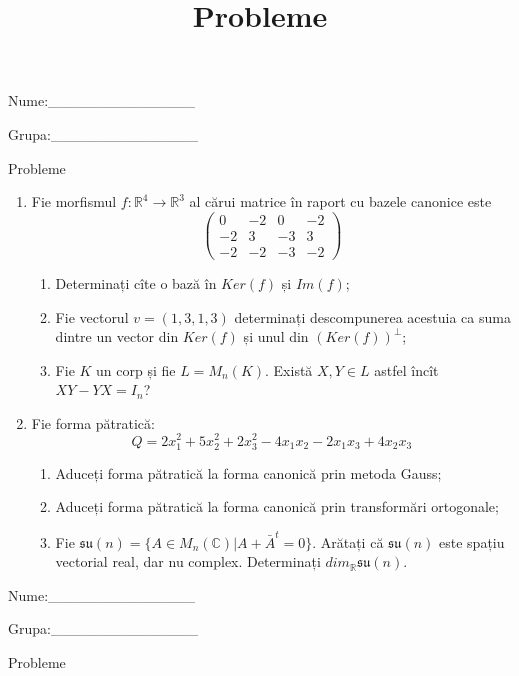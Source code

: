 \documentclass{article}
\title{Probleme}
\author{ }
\date{ }
\begin{document}
\begin{flushright}
Nume:\_\_\_\_\_\_\_\_\_\_\_\_\_\_
 
 
Grupa:\_\_\_\_\_\_\_\_\_\_\_\_\_\_
\end{flushright}
\begin{center}
\vspace{2cm}
{\Large Probleme}
\vspace{2cm}
\end{center}
\begin{enumerate}
 \item Fie morfismul $f:\mathbb{R}^4 \to \mathbb{R}^3$ al cărui matrice în raport cu bazele canonice este
$$\begin{pmatrix}
0&-2&0&-2\\
-2&3&-3&3\\
-2&-2&-3&-2
\end{pmatrix}$$

\begin{enumerate}
\item Determinați cîte o bază în $Ker(f)$ și $Im(f)$;
\item Fie vectorul $v=(1,3,1,3)$ determinați descompunerea acestuia ca suma dintre un vector din $Ker(f)$ și unul din $(Ker(f))^\perp$;
\item Fie $K$ un corp și fie $L=M_n(K)$. Există $X,Y \in L$ astfel încît $XY-YX=I_n$?  
\end{enumerate}
\item Fie forma pătratică:
$$Q= 2x_1^2+5x_2^2+2x_3^2-4x_1x_2-2x_1x_3+4x_2x_3$$

\begin{enumerate}
\item Aduceți forma pătratică la forma canonică prin metoda Gauss;
\item Aduceți forma pătratică la forma canonică prin transformări ortogonale;
\item Fie $\mathfrak{su}(n)=\{ A \in M_n(\mathbb{C}) | A+\bar{A}^t=0\}$. Arătați că $\mathfrak{su}(n)$ este spațiu vectorial real, dar nu complex.
Determinați $dim_{\mathbb{R}}\mathfrak{su}(n)$.
\end{enumerate}
\end{enumerate}
\newpage
\begin{flushright}
Nume:\_\_\_\_\_\_\_\_\_\_\_\_\_\_
 
 
Grupa:\_\_\_\_\_\_\_\_\_\_\_\_\_\_
\end{flushright}
\begin{center}
\vspace{2cm}
{\Large Probleme}
\vspace{2cm}
\end{center}
\end{document}
